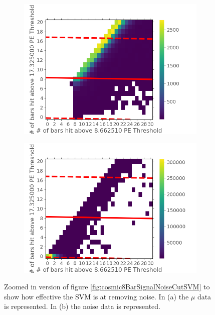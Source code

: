\begin{figure}[!h]
\centering
\begin{subfigure}{.5\textwidth}
  \centering
  \includegraphics[width=\linewidth]{Chapter5/Figs/Raster/Cosmic8BarSignalZoomCutSVM.png}
  \captionsetup{width=.9\linewidth}
  \caption{} 
  \label{subFig:cosmic8BarSignalZoomCutSVM}
\end{subfigure}%
\begin{subfigure}{.5\textwidth}
  \centering
\includegraphics[width=\linewidth]{Chapter5/Figs/Raster/Cosmic8BarNoiseZoomCutSVM.png}
  \captionsetup{width=.9\linewidth}
  \caption{}
  \label{subFig:Cosmic8BarNoiseZoomCutSVM}
\end{subfigure}
\caption{Zoomed in version of figure \ref{fig:cosmic8BarSignalNoiseCutSVM} to show how effective the SVM is at removing noise. In (a) the $\mu$ data is represented. In (b) the noise data is represented.}
\label{fig:Cosmic8BarSignalNoiseZoomCutSVM}
\end{figure}

